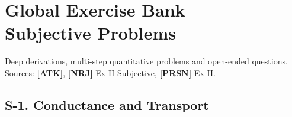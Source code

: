 \chapter*{Global Exercise Bank --- Subjective Problems}
\label{chap:subjective}

\begin{tcolorbox}[enhanced,colback=subtleblue,colframe=primarynavy,arc=2mm,boxrule=1pt,
    title=\textbf{\large Subjective / Descriptive Problems (All Chapters)}]
Deep derivations, multi-step quantitative problems and open-ended questions.
Sources: \textbf{[ATK]}, \textbf{[NRJ]} Ex-II Subjective, \textbf{[PRSN]} Ex-II.
\end{tcolorbox}

\section*{S-1. Conductance and Transport}

